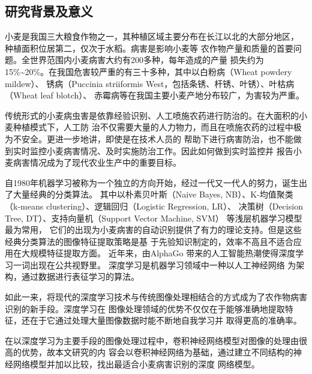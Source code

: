 \setcounter{page}{1} %
\subsection{\textbf{研究背景及意义}}
	小麦是我国三大粮食作物之一，其种植区域主要分布在长江以北的大部分地区，
	种植面积位居第二，仅次于水稻。病害是影响小麦等
	农作物产量和质量的首要问题。全世界范围内小麦病害大约有200多种，每年造成的产量
	损失约为15\%\textasciitilde20\%。在我国危害较严重的有三十多种，其中以白粉病（Wheat powdery mildew）、
	锈病（Puccinia striiformis West，包括条锈、杆锈、叶锈）、叶枯病（Wheat leaf blotch）、
	赤霉病等在我国主要小麦产地分布较广，为害较为严重。

	传统形式的小麦病虫害是依靠经验识别、人工喷施农药进行防治的。在大面积的小麦种植模式下，人工防
	治不仅需要大量的人力物力，而且在喷施农药的过程中极为不安全。更进一步地讲，即使是在技术人员的
	帮助下进行病害防治，也不能做到实时监控小麦病害情况、及时实施防治工作。因此如何做到实时监控并
	报告小麦病害情况成为了现代农业生产中的重要目标。

	自1980年机器学习被称为一个独立的方向开始，经过一代又一代人的努力，诞生出了大量经典的分类算法。
	其中以朴素贝叶斯（Naive Bayes, NB）、K-均值聚类（k-means clustering）、逻辑回归（Logistic Regression, LR）、
	决策树（Decision Tree, DT）、支持向量机（Support Vector Machine, SVM）
	等浅层机器学习模型最为常用，
	它们的出现为小麦病害的自动识别提供了有力的理论支持。但是这些经典分类算法的图像特征提取策略是基
	于先验知识制定的，效率不高且不适合应用在大规模特征提取方面。 近年来，由AlphaGo
	带来的人工智能热潮使得深度学习一词出现在公共视野里。 深度学习是机器学习领域中一种以人工神经网络
	为架构，通过数据进行表征学习的算法。

	如此一来，将现代的深度学习技术与传统图像处理相结合的方式成为了农作物病害识别的新手段。深度学习在
	图像处理领域的优势不仅仅在于能够准确地提取特征，还在于它通过处理大量图像数据时能不断地自我学习并
	取得更高的准确率。

	在以深度学习为主要手段的图像处理过程中，卷积神经网络模型对图像的处理由很高的优势，故本文研究的内
	容会以卷积神经网络为基础，通过建立不同结构的神经网络模型并加以比较，找出最适合小麦病害识别的深度
	网络模型。
